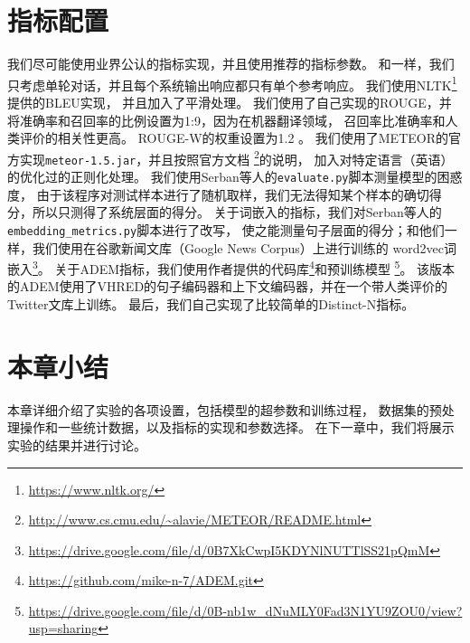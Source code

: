 \section{指标配置}\label{sec:metric_config}
我们尽可能使用业界公认的指标实现，并且使用推荐的指标参数。
和\cite{HowNot}一样，我们只考虑单轮对话，并且每个系统输出响应都只有单个参考响应。
我们使用NLTK\footnote{\url{https://www.nltk.org/}}提供的BLEU实现， 并且加入了平滑处理。
我们使用了自己实现的ROUGE，并将准确率和召回率的比例设置为1:9，因为在机器翻译领域，
召回率比准确率和人类评价的相关性更高。
ROUGE-W的权重设置为1.2 。
我们使用了METEOR的官方实现\texttt{meteor-1.5.jar}，并且按照官方文档
\footnote{\url{http://www.cs.cmu.edu/~alavie/METEOR/README.html}}的说明，
加入对特定语言（英语）的优化过的正则化处理。
我们使用Serban等人的\texttt{evaluate.py}脚本测量模型的困惑度，
由于该程序对测试样本进行了随机取样，我们无法得知某个样本的确切得分，所以只测得了系统层面的得分。
关于词嵌入的指标，我们对Serban等人的\texttt{embedding\_metrics.py}脚本进行了改写，
使之能测量句子层面的得分；和他们一样，我们使用在谷歌新闻文库（Google News Corpus）上进行训练的
word2vec词嵌入\footnote{\url{https://drive.google.com/file/d/0B7XkCwpI5KDYNlNUTTlSS21pQmM}}。
关于ADEM指标，我们使用作者提供的代码库\footnote{\url{https://github.com/mike-n-7/ADEM.git}}和预训练模型
\footnote{\url{https://drive.google.com/file/d/0B-nb1w_dNuMLY0Fad3N1YU9ZOU0/view?usp=sharing}}。
该版本的ADEM使用了VHRED的句子编码器和上下文编码器，并在一个带人类评价的Twitter文库上训练。
最后，我们自己实现了比较简单的Distinct-N指标。

\section{本章小结}\label{sec:method_conclusion}
本章详细介绍了实验的各项设置，包括模型的超参数和训练过程，
数据集的预处理操作和一些统计数据，以及指标的实现和参数选择。
在下一章中，我们将展示实验的结果并进行讨论。
